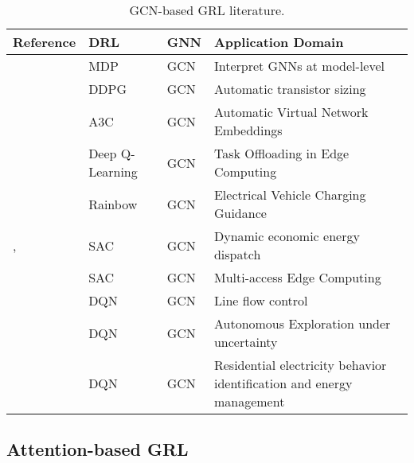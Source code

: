 \begin{table}[H] 
	\centering
	\caption{\acs{GCN}-based \acs{GRL} literature.}
	\begin{tabular}{P{2cm}P{2cm}P{2cm}p{5cm}}
		\toprule
		\textbf{Reference} & \textbf{DRL} & \textbf{GNN}& \textbf{Application Domain} \\
		\midrule
		\cite{yuanXGNNModelLevelExplanations2020} & MDP & GCN & Interpret GNNs at model-level \\
		\cite{wangGCNRLCircuitDesigner2020} & DDPG & GCN & Automatic transistor sizing \\
		\cite{yanAutomaticVirtualNetwork2020} & A3C & GCN & Automatic Virtual Network Embeddings \\
		\cite{tangDependentTaskOffloading2020} & Deep Q-Learning & GCN & Task Offloading in Edge Computing \\
		\cite{xingGraphReinforcementLearningBased2023} & Rainbow  &  GCN & Electrical Vehicle Charging Guidance \\
		\cite{liNovelGraphReinforcement2022}, \cite{chenScalableGraphReinforcement2023} & SAC & GCN & Dynamic economic energy dispatch \\
		\cite{lengGraphConvolutionalNetworkbased2021} & SAC & GCN & Multi-access Edge Computing \\
		\cite{xuSimulationConstraintGraphReinforcement2020} & DQN & GCN & Line flow control \\
		\cite{chenAutonomousExplorationUncertainty2020} & DQN & GCN  & Autonomous Exploration under uncertainty \\ 
		\cite{chenGraphRepresentationLearningbased2023} & DQN & GCN & Residential electricity behavior identification and energy management \\ 
		\bottomrule
	\end{tabular}
	\label{tab:gcn-lit}
\end{table}




\subsection{Attention-based GRL} \label{sec:review-gat}


